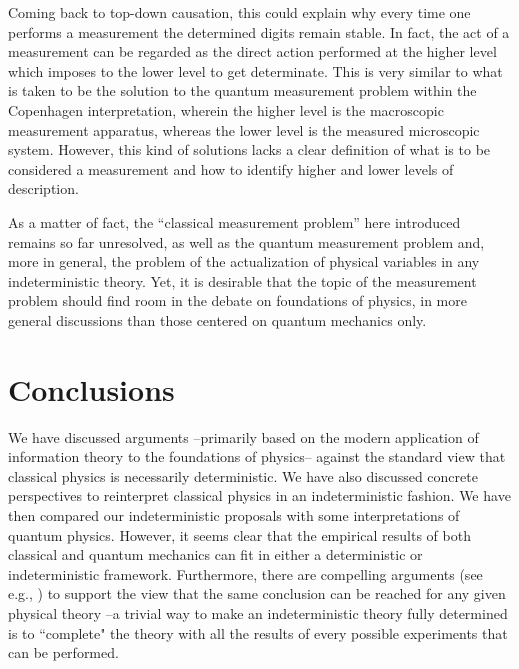 \documentclass[12pt]{article}
\begin{document}
Coming back to top-down causation, this could explain why every time one performs a measurement the determined digits remain stable. In fact, the act of a measurement can be regarded as the direct action performed at the higher level which imposes to the lower level to get  determinate. This is very similar to what is taken to be the solution to the quantum measurement problem within the Copenhagen interpretation, wherein the higher level is the macroscopic measurement apparatus, whereas the lower level is the measured microscopic system. However, this kind of solutions lacks a clear definition of what is to be considered a measurement and how to identify higher and lower levels of description.


As a matter of fact, the ``classical measurement problem'' here introduced remains so far unresolved, as well as the quantum measurement problem and, more in general, the problem of the actualization of physical variables in any indeterministic theory. Yet, it is desirable that the topic of the measurement problem should find room in the debate on foundations of physics, in more general discussions than those centered on quantum mechanics only.


\section{Conclusions}

We have discussed arguments --primarily based on the modern application of information theory to the foundations of physics-- against the standard view that classical physics is necessarily deterministic. We have also discussed concrete perspectives to reinterpret classical physics in an indeterministic fashion. We have then compared our indeterministic proposals with some interpretations of quantum physics. However, it seems clear that the empirical results of both classical and quantum mechanics can fit in either a deterministic or indeterministic framework. Furthermore, there are compelling arguments (see e.g., \cite{gisin1, suppes, wendl}) to support the view that the same conclusion can be reached for any given physical theory --a trivial way to make an indeterministic theory fully determined is to ``complete" the theory with all the results of every possible experiments that can be performed.
\end{document}
